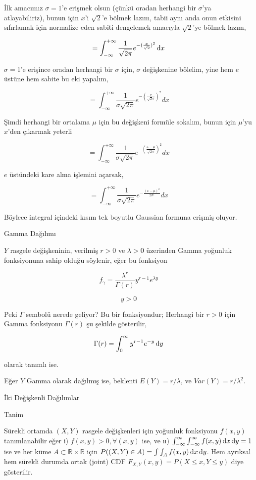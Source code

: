 \documentclass[12pt,fleqn]{article}\usepackage{../../common}
\begin{document}
İlk amacımız $\sigma = 1$'e erişmek olsun (çünkü oradan herhangi bir $\sigma$'ya
atlayabiliriz), bunun için $x$'i $\sqrt{2}$'e bölmek lazım, tabii aynı anda onun
etkisini sıfırlamak için normalize eden sabiti dengelemek amacıyla $\sqrt{2}$'ye
bölmek lazım,

$$
= \int _{-\infty}^{+\infty}
\frac{1}{\sqrt{2\pi}} e^{-(\frac{x}{\sqrt{2}})^2}\,\mathrm{d} x
$$

$\sigma = 1$'e erişince oradan herhangi bir $\sigma$ için, $\sigma$ değişkenine
bölelim, yine hem $e$ üstüne hem sabite bu eki yapalım,

$$ = \int _{-\infty}^{+\infty} 
\frac{1}{\sigma \sqrt{2\pi}} 
e^{-(\frac{x}{\sqrt{2} \sigma })^2} dx
$$

Şimdi herhangi bir ortalama $\mu$ için bu değişkeni formüle sokalım, bunun
için $\mu$'yu $x$'den çıkarmak yeterli

$$ = \int _{-\infty}^{+\infty} 
\frac{1}{\sigma \sqrt{2\pi}} 
e^{-(\frac{x-\mu}{\sqrt{2} \sigma })^2} dx
$$

$e$ üstündeki kare alma işlemini açarsak,

$$ = \int _{-\infty}^{+\infty} 
\frac{1}{\sigma \sqrt{2\pi}} 
e^{-  \frac{(x-\mu)^2}{2 \sigma^2 }} dx
$$

Böylece integral içindeki kısım tek boyutlu Gaussian formuna erişmiş
oluyor. 

Gamma Dağılımı

$Y$ rasgele değişkeninin, verilmiş $r>0$ ve $\lambda > 0$ üzerinden Gamma
yoğunluk fonksiyonuna sahip olduğu söylenir, eğer bu fonksiyon

$$ f_{\gamma} =  \frac{\lambda^r}{\Gamma(r)}y^{r-1}e^{\lambda y}$$

$$ y>0  $$

Peki $\Gamma$ sembolü nerede geliyor? Bu bir fonksiyondur; Herhangi bir
$r>0$ için Gamma fonksiyonu $\Gamma(r)$ şu şekilde gösterilir,

$$ \Gamma(r) = \int _{0}^{\infty}y^{r-1}e^{-y} \,\mathrm{d} y $$

olarak tanımlı ise. 

Eğer $Y$ Gamma olarak dağılmış ise, beklenti $E(Y) = r/\lambda$, ve $Var(Y)
= r/\lambda^2$. 

İki Değişkenli Dağılımlar 

Tanim

Sürekli ortamda $(X,Y)$ rasgele değişkenleri için yoğunluk fonksiyonu $f(x,y)$
tanımlanabilir eğer i) $f(x,y) > 0, \forall (x,y)$ ise, ve ıı) $\int _{
  -\infty}^{\infty} \int _{ -\infty}^{\infty} f(x,y) \,\mathrm{d} x \,\mathrm{d} y = 1$ ise ve her
küme $A \subset \mathbb{R} \times \mathbb{R}$ için $P((X,Y) \in A) = \int \int_A
f(x,y) \,\mathrm{d} x \,\mathrm{d} y$. Hem ayrıksal hem sürekli durumda ortak (joint) CDF
$F_{X,Y}(x,y) = P (X \le x, Y \le y)$ diye gösterilir.
\end{document}
